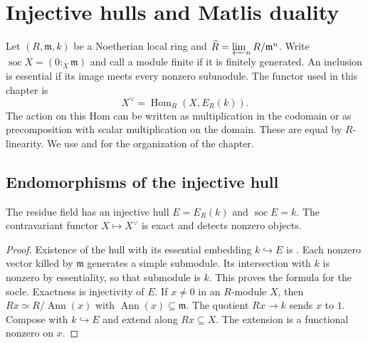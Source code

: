 \chapter{Injective hulls and Matlis duality}\label{ch:matlis}

Let $(R,\mathfrak m,k)$ be a Noetherian local ring and
$\widehat R=\varprojlim_n R/\mathfrak m^n$. Write
$\operatorname{soc}X=(0:_X\mathfrak m)$ and call a module finite if it is
finitely generated. An inclusion is essential if its image meets every
nonzero submodule. The functor used in this chapter is
\[
     X^\vee=\operatorname{Hom}_R(X,E_R(k)).
\]
The action on this Hom can be written as multiplication in the codomain
or as precomposition with scalar multiplication on the domain. These are
equal by $R$-linearity. We use \cite[Sections 6--7]{st-dual} and
\cite[Section 3.2]{bruns} for the organization of the chapter.

\section{Endomorphisms of the injective hull}

\begin{proposition}\label{res:M01}
The residue field has an injective hull $E=E_R(k)$ and
$\operatorname{soc}E=k$. The contravariant functor $X\mapsto X^\vee$
is exact and detects nonzero objects.
\end{proposition}
\begin{proof}
Existence of the hull with its essential embedding $k\hookrightarrow E$
is \cite[ALG-03-C02-S03]{p103}. Each nonzero vector killed by
$\mathfrak m$ generates a simple submodule. Its intersection with $k$
is nonzero by essentiality, so that submodule is $k$. This proves the
formula for the socle. Exactness is injectivity of $E$. If $x\ne0$ in
an $R$-module $X$, then $Rx\simeq R/\operatorname{Ann}(x)$ with
$\operatorname{Ann}(x)\subseteq\mathfrak m$. The quotient $Rx\to k$
sends $x$ to $1$. Compose with $k\hookrightarrow E$ and extend along
$Rx\subseteq X$. The extension is a functional nonzero on $x$.
\end{proof}

